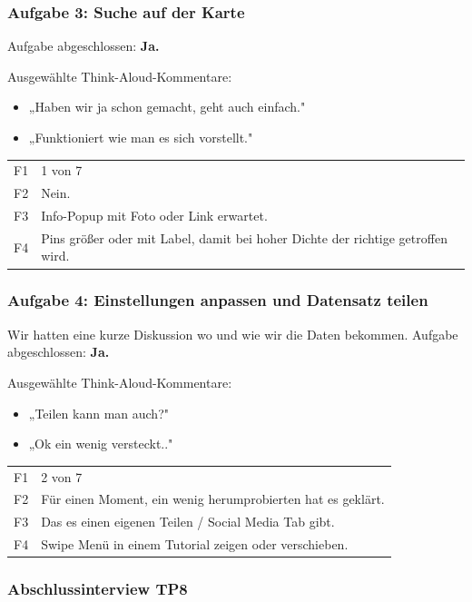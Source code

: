 \documentclass{article}
\begin{document}
\subsubsection*{Aufgabe 3: Suche auf der Karte}

Aufgabe abgeschlossen: \textbf{Ja.}

\bigskip
Ausgewählte Think-Aloud-Kommentare:
\begin{itemize}
  \item „Haben wir ja schon gemacht, geht auch einfach."
  \item „Funktioniert wie man es sich vorstellt."
\end{itemize}

\begin{tabular}{@{}lp{10cm}@{}}
  F1 & 1 von 7 \\
  F2 & Nein. \\
  F3 & Info-Popup mit Foto oder Link erwartet. \\
  F4 & Pins größer oder mit Label, damit bei hoher Dichte der richtige
       getroffen wird. \\
\end{tabular}

\subsubsection*{Aufgabe 4: Einstellungen anpassen und Datensatz teilen}

Wir hatten eine kurze Diskussion wo und wie wir die Daten bekommen.
Aufgabe abgeschlossen: \textbf{Ja.}

\bigskip
Ausgewählte Think-Aloud-Kommentare:
\begin{itemize}
  \item „Teilen kann man auch?"
  \item „Ok ein wenig versteckt.."
\end{itemize}

\begin{tabular}{@{}lp{10cm}@{}}
  F1 & 2 von 7 \\
  F2 & Für einen Moment, ein wenig herumprobierten hat es geklärt. \\
  F3 & Das es einen eigenen Teilen / Social Media Tab gibt. \\
  F4 & Swipe Menü in einem Tutorial zeigen oder verschieben. \\
\end{tabular}

\subsubsection*{Abschlussinterview TP8}
\end{document}
